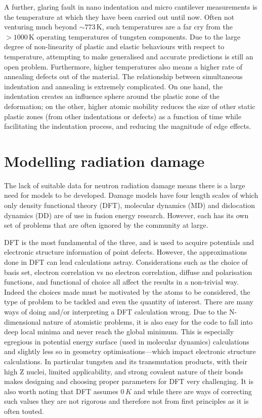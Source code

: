 \documentclass[12pt, a4paper]{article}
\begin{document}
		A further, glaring fault in nano indentation and micro cantilever measurements is the temperature at which they have been carried out until now. Often not venturing much beyond $\sim 773\, \textrm{K}$, such temperatures are a far cry from the $>1000 \, \textrm{K}$ operating temperatures of tungsten components. Due to the large degree of non-linearity of plastic and elastic behaviours with respect to temperature, attempting to make generalised and accurate predictions is still an open problem. Furthermore, higher temperatures also means a higher rate of annealing defects out of the material. The relationship between simultaneous indentation and annealing is extremely complicated. On one hand, the indentation creates an influence sphere around the plastic zone of the deformation; on the other, higher atomic mobility reduces the size of other static plastic zones (from other indentations or defects) as a function of time while facilitating the indentation process, and reducing the magnitude of edge effects.
	\section{Modelling radiation damage}
		The lack of suitable data for neutron radiation damage means there is a large need for models to be developed. Damage models have four length scales of which only density functional theory (DFT), molecular dynamics (MD) and dislocation dynamics (DD) are of use in fusion energy research. However, each has its own set of problems that are often ignored by the community at large.
		
		DFT is the most fundamental of the three, and is used to acquire potentials and electronic structure information of point defects. However, the approximations done in DFT can lead calculations astray. Considerations such as the choice of basis set, electron correlation vs no electron correlation, diffuse and polarisation functions, and functional of choice all affect the results in a non-trivial way. Indeed the choices made must be motivated by the atoms to be considered, the type of problem to be tackled and even the quantity of interest. There are many ways of doing and/or interpreting a DFT calculation wrong. Due to the N-dimensional nature of atomistic problems, it is also easy for the code to fall into deep local minima and never reach the global minimum. This is especially egregious in potential energy surface (used in molecular dynamics) calculations and slightly less so in geometry optimisations---which impact electronic structure calculations. In particular tungsten and its transmutation products, with their high Z nuclei, limited applicability, and strong covalent nature of their bonds makes designing and choosing proper parameters for DFT very challenging. It is also worth noting that DFT assumes $0\,K$ and while there are ways of correcting such values they are not rigorous and therefore not from first principles as it is often touted.
		
\end{document}
